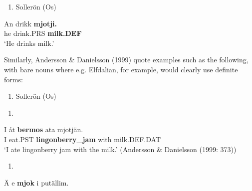 \begin{enumerate} %
\item 
\label{bkm:Ref173318047}Sollerön (Os) 

\end{enumerate} %
\ea\label{}
\gll An  drikk  \textbf{mjotji.}\\


he  drink.PRS  \textbf{milk.DEF}\\ %


‘He drinks milk.’ 
\z


Similarly, Andersson \& Danielsson (1999) quote examples such as the following, with bare nouns where e.g. Elfdalian, for example, would clearly use definite forms:

\begin{enumerate} %
\item 
Sollerön (Os) 

\end{enumerate} %
\setcounter{listLFOxcviiileveli}{0}
\begin{enumerate} %
\item 
\end{enumerate} %
\ea\label{}
\gll I  åt  \textbf{bermos} ata  mjotjän.\\


I  eat.PST  \textbf{lingonberry\_jam} with  milk.DEF.DAT\\ %


‘I ate lingonberry jam with the milk.’ (Andersson \& Danielsson (1999: 373))
\z

\begin{enumerate} %
\item 
\end{enumerate} %
\ea\label{}
\gll Ä  e  \textbf{mjok} i  putällim.\\


